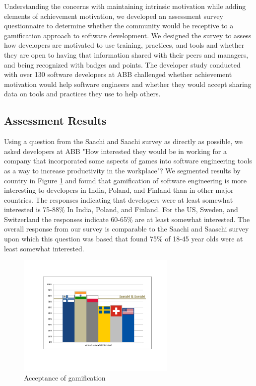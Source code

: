 \documentclass{sig-alternate}
\begin{document}
Understanding the concerns with maintaining intrinsic motivation while adding elements of achievement motivation, we developed an assessment survey questionnaire to determine whether the community would be receptive to a gamification approach to software development.   We designed  the survey to assess how developers are motivated to use training, practices, and tools and whether they are open to having that information shared with their peers and managers, and being recognized with badges and points. The developer study conducted with over 130 software developers at ABB challenged whether achievement motivation would help software engineers and whether they would accept sharing data on tools and practices they use to help others.

\subsection{Assessment Results}

Using a question from the Saachi and Saachi survey\cite{wbsnipes:SaatchiGameification} as directly as possible, we asked developers at ABB "How interested they would be in working for a company that incorporated some aspects of games into software engineering tools as a way to increase productivity in the workplace"?  We segmented results by country in Figure \ref{fig:gamification} and found that gamification of software engineering is more interesting to developers in India, Poland, and Finland than in other major countries.  The responses indicating that developers were at least somewhat interested is 75-88\% In India, Poland, and Finland.  For the US, Sweden, and Switzerland the responses indicate 60-65\% are at least somewhat interested.  The overall response from our survey is comparable to the Saachi and Saaschi survey\cite{wbsnipes:SaatchiGameification} upon which this question was based that found 75\% of 18-45 year olds were at least somewhat interested.  

\begin{figure}\begin{mdframed}[linecolor=white]
	\includegraphics[width=3in]{gamificationquestion.pdf}
	\caption{Acceptance of gamification}
	\label{fig:gamification}
\end{mdframed}\end{figure}
\end{document}
